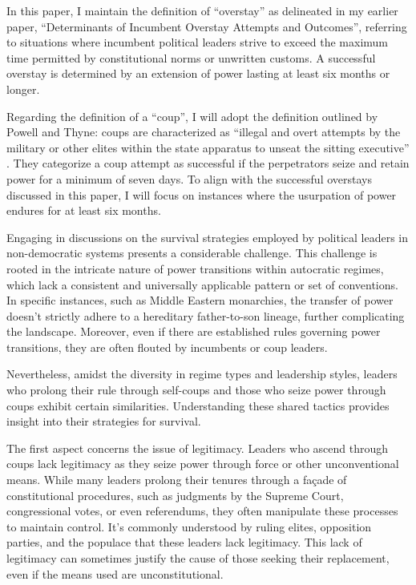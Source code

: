 \documentclass[
  12pt,
  a4paper,
  12pt]{article}
\begin{document}
In this paper, I maintain the definition of ``overstay'' as delineated
in my earlier paper, ``Determinants of Incumbent Overstay Attempts and
Outcomes'', referring to situations where incumbent political leaders
strive to exceed the maximum time permitted by constitutional norms or
unwritten customs. A successful overstay is determined by an extension
of power lasting at least six months or longer.

Regarding the definition of a ``coup'', I will adopt the definition
outlined by Powell and Thyne: coups are characterized as ``illegal and
overt attempts by the military or other elites within the state
apparatus to unseat the sitting executive'' \citep[p252]{powell2011}.
They categorize a coup attempt as successful if the perpetrators seize
and retain power for a minimum of seven days. To align with the
successful overstays discussed in this paper, I will focus on instances
where the usurpation of power endures for at least six months.

Engaging in discussions on the survival strategies employed by political
leaders in non-democratic systems presents a considerable challenge.
This challenge is rooted in the intricate nature of power transitions
within autocratic regimes, which lack a consistent and universally
applicable pattern or set of conventions. In specific instances, such as
Middle Eastern monarchies, the transfer of power doesn't strictly adhere
to a hereditary father-to-son lineage, further complicating the
landscape. Moreover, even if there are established rules governing power
transitions, they are often flouted by incumbents or coup leaders.

Nevertheless, amidst the diversity in regime types and leadership
styles, leaders who prolong their rule through self-coups and those who
seize power through coups exhibit certain similarities. Understanding
these shared tactics provides insight into their strategies for
survival.

The first aspect concerns the issue of legitimacy. Leaders who ascend
through coups lack legitimacy as they seize power through force or other
unconventional means. While many leaders prolong their tenures through a
façade of constitutional procedures, such as judgments by the Supreme
Court, congressional votes, or even referendums, they often manipulate
these processes to maintain control. It's commonly understood by ruling
elites, opposition parties, and the populace that these leaders lack
legitimacy. This lack of legitimacy can sometimes justify the cause of
those seeking their replacement, even if the means used are
unconstitutional.
\end{document}
